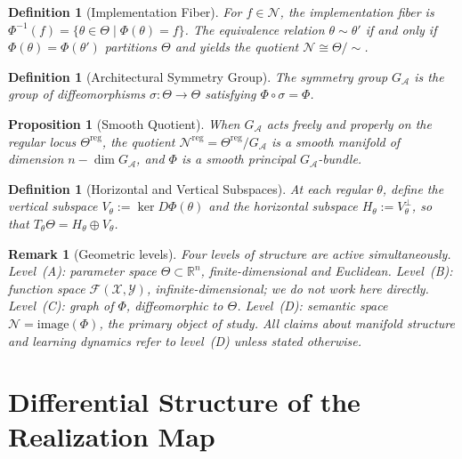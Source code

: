 \documentclass[twocolumn,10pt]{article}
\theoremstyle{thmstyle}
\newtheorem{proposition}[theorem]{Proposition}
\theoremstyle{defstyle}
\newtheorem{definition}[theorem]{Definition}
\newtheorem{remark}[theorem]{Remark}
\begin{document}
\begin{definition}[Implementation Fiber]
For $f \in \mathcal{N}$, the \emph{implementation fiber} is
$\Phi^{-1}(f) = \{\theta \in \Theta \mid \Phi(\theta) = f\}$.
The equivalence relation $\theta \sim \theta'$ if and only if
$\Phi(\theta) = \Phi(\theta')$ partitions $\Theta$ and yields the
quotient $\mathcal{N} \cong \Theta/{\sim}$.
\end{definition}

\begin{definition}[Architectural Symmetry Group]
The \emph{symmetry group} $G_\mathcal{A}$ is the group of
diffeomorphisms $\sigma : \Theta \to \Theta$ satisfying
$\Phi \circ \sigma = \Phi$.
\end{definition}

\begin{proposition}[Smooth Quotient]
When $G_\mathcal{A}$ acts freely and properly on the regular locus
$\Theta^{\mathrm{reg}}$, the quotient $\mathcal{N}^{\mathrm{reg}} =
\Theta^{\mathrm{reg}}/G_\mathcal{A}$ is a smooth manifold of dimension
$n - \dim G_\mathcal{A}$, and $\Phi$ is a smooth principal
$G_\mathcal{A}$-bundle.
\end{proposition}

\begin{definition}[Horizontal and Vertical Subspaces]
At each regular $\theta$, define the \emph{vertical subspace}
$V_\theta := \ker D\Phi(\theta)$ and the \emph{horizontal subspace}
$H_\theta := V_\theta^\perp$, so that
$T_\theta\Theta = H_\theta \oplus V_\theta$.
\end{definition}

\begin{remark}[Geometric levels]
Four levels of structure are active simultaneously.
Level~(A): parameter space $\Theta \subset \mathbb{R}^n$,
finite-dimensional and Euclidean.
Level~(B): function space $\mathcal{F}(\mathcal{X},\mathcal{Y})$,
infinite-dimensional; we do not work here directly.
Level~(C): graph of $\Phi$, diffeomorphic to $\Theta$.
Level~(D): semantic space $\mathcal{N} = \mathrm{image}(\Phi)$, the
primary object of study. All claims about manifold structure and
learning dynamics refer to level~(D) unless stated otherwise.
\end{remark}

\section{Differential Structure of the Realization Map}
\label{sec:differential}
\end{document}
